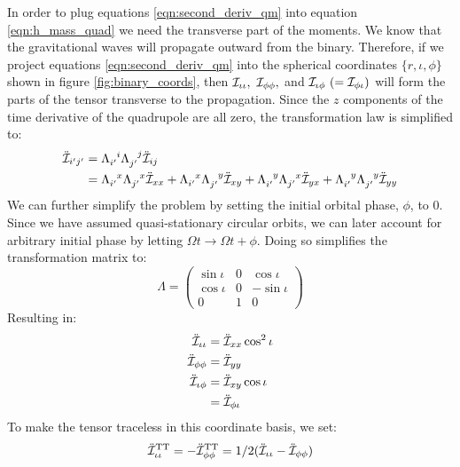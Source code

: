 In order to plug equations \ref{eqn:second_deriv_qm} into equation \ref{eqn:h_mass_quad} we need the transverse part of the moments. We know that the gravitational waves will propagate outward from the binary. Therefore, if we project equations \ref{eqn:second_deriv_qm} into the spherical coordinates $\{r,\iota,\phi\}$ shown in figure \ref{fig:binary_coords}, then $\mathcal{I}_{\iota\iota},~\mathcal{I}_{\phi\phi},$ and $\mathcal{I}_{\iota\phi}~ (= \mathcal{I}_{\phi\iota})$ will form the parts of the tensor transverse to the propagation. Since the $z$ components of the time derivative of the quadrupole are all zero, the transformation law is simplified to:
\begin{align*}
\ddot{\qI}_{i'j'}  &= \Lambda\indices{_{i'}^i} \Lambda\indices{_{j'}^j} \ddot{\qI}_{ij} \\
            &= \Lambda\indices{_{i'}^x} \Lambda\indices{_{j'}^x} \ddot{\qI}_{xx} + \Lambda\indices{_{i'}^x} \Lambda\indices{_{j'}^y} \ddot{\qI}_{xy} + \Lambda\indices{_{i'}^y} \Lambda\indices{_{j'}^x} \ddot{\qI}_{yx} + \Lambda\indices{_{i'}^y} \Lambda\indices{_{j'}^y} \ddot{\qI}_{yy}
\end{align*}
We can further simplify the problem by setting the initial orbital phase, $\phi$, to 0. Since we have assumed quasi-stationary circular orbits, we can later account for arbitrary initial phase by letting $\Omega t \rightarrow \Omega t + \phi$. Doing so simplifies the transformation matrix to:
\begin{equation*}
\Lambda = \begin{pmatrix}
    \sin \iota &    0    &  \cos \iota \\
    \cos \iota &    0    &  -\sin \iota \\
         0     &    1    &    0
    \end{pmatrix}
\end{equation*}
Resulting in:
\begin{align*}
\ddot{\mathcal{I}}_{\iota\iota} &= \ddot{\mathcal{I}}_{xx} \cos^2\iota \\
\ddot{\mathcal{I}}_{\phi\phi}   &= \ddot{\mathcal{I}}_{yy} \\
\ddot{\mathcal{I}}_{\iota\phi}  &= \ddot{\mathcal{I}}_{xy} \cos \iota \\
                        &= \ddot{\mathcal{I}}_{\phi\iota}
\end{align*}
To make the tensor traceless in this coordinate basis, we set:
\begin{equation*}
\ddot{\mathcal{I}}^{\mathrm{TT}}_{\iota\iota} = -\ddot{\mathcal{I}}^{\mathrm{TT}}_{\phi\phi} = 1/2(\ddot{\mathcal{I}}_{\iota\iota} - \ddot{\mathcal{I}}_{\phi\phi})
\end{equation*}
